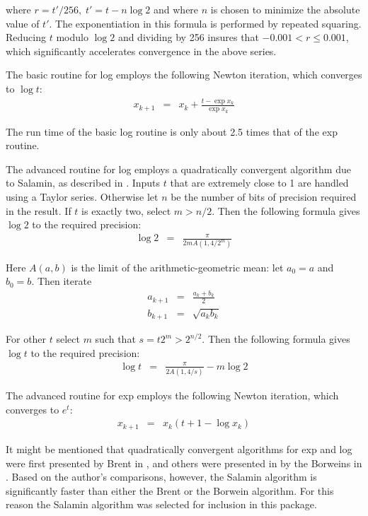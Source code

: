 \noindent
where $r = t' / 256, \; t' = t - n \log 2$ and where $n$ is chosen to
minimize the absolute value of $t'$.  The exponentiation in this
formula is performed by repeated squaring.  Reducing $t$ modulo $\log
2$ and dividing by 256 insures that $-0.001 < r \leq 0.001$, which
significantly accelerates convergence in the above series.
 
The basic routine for log employs the following Newton iteration,
which converges to $\log t$:
\begin{eqnarray*}
x_{k+1} &=& x_k + \frac{t - \exp x_k}{\exp x_k}
\end{eqnarray*}

\noindent
The run time of the basic log routine is only about 2.5 times that of
the exp routine.

The advanced routine for log employs a quadratically convergent
algorithm due to Salamin, as described in \cite{brent3}.  Inputs $t$
that are extremely close to 1 are handled using a Taylor series.
Otherwise let $n$ be the number of bits of precision required in the
result.  If $t$ is exactly two, select $m > n / 2$.  Then the
following formula gives $\log 2$ to the required precision:
\begin{eqnarray*}
\log 2 &=& \frac{\pi}{2 m A (1, 4 / 2^m)}
\end{eqnarray*}

\noindent
Here $A(a, b)$ is the limit of the arithmetic-geometric mean: let $a_0
= a$ and $b_0 = b$.  Then iterate
\begin{eqnarray*}
a_{k+1} &=& \frac{a_k + b_k}{2} \\
b_{k+1} &=& \sqrt{a_k b_k}
\end{eqnarray*}

\noindent
For other $t$ select $m$ such that $s = t 2^m > 2^{n/2}$.  Then the
following formula gives $\log t$ to the required precision:
\begin{eqnarray*}
\log t &=& \frac{\pi}{2 A (1, 4 / s)} - m \log 2
\end{eqnarray*}

The advanced routine for exp employs the following Newton iteration,
which converges to $e^t$:
\begin{eqnarray*}
x_{k+1} &=& x_k (t + 1 - \log x_k)
\end{eqnarray*}
 
It might be mentioned that quadratically convergent algorithms for exp
and log were first presented by Brent in \cite{brent1}, and others
were presented in by the Borweins in \cite{borw1}.  Based on the
author's comparisons, however, the Salamin algorithm is significantly
faster than either the Brent or the Borwein algorithm.  For this
reason the Salamin algorithm was selected for inclusion in this
package.


